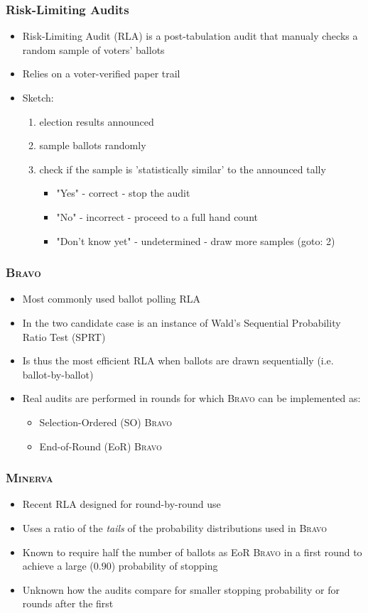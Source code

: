 \documentclass{beamer}
\newcommand{\Minerva}{\textsc{Minerva}\xspace}
\newcommand{\BRAVO}{\textsc{Bravo}\xspace}
\begin{document}
\begin{frame}
\frametitle{Risk-Limiting Audits}

\begin{itemize}
\item Risk-Limiting Audit (RLA) is a post-tabulation audit that manualy
checks a random sample of voters' ballots
\item Relies on a voter-verified paper trail
\item Sketch:
\begin{enumerate}
\item election results announced
\item sample ballots randomly
\item check if the sample is 'statistically similar' to the announced tally
\begin{itemize}
\item "Yes" - correct - stop the audit
\item "No" - incorrect - proceed to a full hand count
\item "Don't know yet" - undetermined - draw more samples (goto: 2)
\end{itemize}
\end{enumerate}
\end{itemize}
\end{frame}

\begin{frame}
\frametitle{\BRAVO}
\begin{itemize}
\item Most commonly used ballot polling RLA
\item In the two candidate case is an instance of Wald's Sequential Probability Ratio Test (SPRT)
\item Is thus the most efficient RLA when ballots are drawn sequentially (i.e. ballot-by-ballot)
\item Real audits are performed in rounds for which \BRAVO can be implemented as:
\begin{itemize}
\item Selection-Ordered (SO) \BRAVO
\item End-of-Round (EoR) \BRAVO
\end{itemize}
\end{itemize}
\end{frame}

\begin{frame}
\frametitle{\Minerva}
\begin{itemize}
\item Recent RLA designed for round-by-round use
\item Uses a ratio of the \emph{tails} of the probability distributions used in \BRAVO
\item Known to require half the number of ballots as EoR \BRAVO in a first round to achieve a large ($0.90$) probability of stopping
\item Unknown how the audits compare for smaller stopping probability or for rounds after the first
\end{itemize}
\end{frame}
\end{document}
